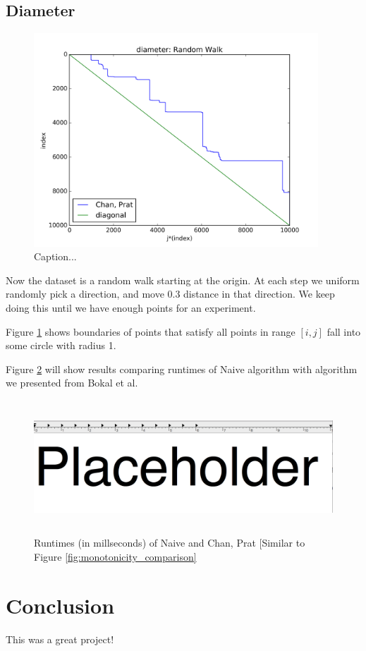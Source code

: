 \documentclass{article}
\begin{document}
\subsection{Diameter}
\begin{figure}[!h]
  \centering
  \includegraphics[height=8cm]{plots/diameter_random_walk}
  \caption{Caption...}
  \label{fig:diameter_demo}
\end{figure}

Now the dataset is a random walk starting at the origin. At each step we uniform randomly pick a direction, and move 0.3 distance in that direction. We keep doing this until we have enough points for an experiment.

Figure \ref{fig:diameter_demo} shows boundaries of points that satisfy all points in range $[i, j]$ fall into some circle with radius 1.

Figure \ref{fig:diameter_comparison} will show results comparing runtimes of Naive algorithm with algorithm we presented from Bokal et al.
\begin{figure}[!ht]
  \centering
  \includegraphics[height=5cm]{plots/diameter_comparison}
  \caption{Runtimes (in millseconds) of Naive and Chan, Prat [Similar to Figure \ref{fig:monotonicity_comparison}}
  \label{fig:diameter_comparison}
\end{figure}


\section{Conclusion}
This was a great project!



\end{document}
